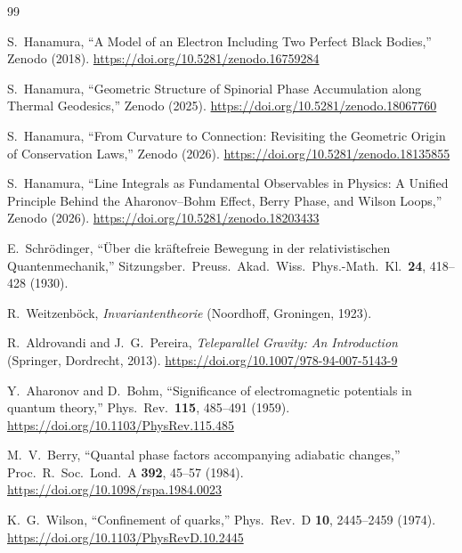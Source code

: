 \documentclass[12pt,letterpaper]{article}
\begin{document}
\begin{thebibliography}{99}

S.~Hanamura,
``A Model of an Electron Including Two Perfect Black Bodies,''
Zenodo (2018).
\href{https://doi.org/10.5281/zenodo.16759284}{https://doi.org/10.5281/zenodo.16759284}

S.~Hanamura,
``Geometric Structure of Spinorial Phase Accumulation along Thermal Geodesics,''
Zenodo (2025).
\href{https://doi.org/10.5281/zenodo.18067760}{https://doi.org/10.5281/zenodo.18067760}

S.~Hanamura,
``From Curvature to Connection: Revisiting the Geometric Origin of Conservation Laws,''
Zenodo (2026).
\href{https://doi.org/10.5281/zenodo.18135855}{https://doi.org/10.5281/zenodo.18135855}

S.~Hanamura,
``Line Integrals as Fundamental Observables in Physics: A Unified Principle Behind the Aharonov--Bohm Effect, Berry Phase, and Wilson Loops,''
Zenodo (2026).
\href{https://doi.org/10.5281/zenodo.18203433}{https://doi.org/10.5281/zenodo.18203433}

E.~Schr\"{o}dinger,
``\"{U}ber die kr\"{a}ftefreie Bewegung in der relativistischen Quantenmechanik,''
Sitzungsber.\ Preuss.\ Akad.\ Wiss.\ Phys.-Math.\ Kl.\ \textbf{24}, 418--428 (1930).

R.~Weitzenb\"{o}ck,
\textit{Invariantentheorie}
(Noordhoff, Groningen, 1923).

R.~Aldrovandi and J.~G.~Pereira,
\textit{Teleparallel Gravity: An Introduction}
(Springer, Dordrecht, 2013).
\href{https://doi.org/10.1007/978-94-007-5143-9}{https://doi.org/10.1007/978-94-007-5143-9}

Y.~Aharonov and D.~Bohm,
``Significance of electromagnetic potentials in quantum theory,''
Phys.\ Rev.\ \textbf{115}, 485--491 (1959).
\href{https://doi.org/10.1103/PhysRev.115.485}{https://doi.org/10.1103/PhysRev.115.485}

M.~V.~Berry,
``Quantal phase factors accompanying adiabatic changes,''
Proc.\ R.\ Soc.\ Lond.\ A \textbf{392}, 45--57 (1984).
\href{https://doi.org/10.1098/rspa.1984.0023}{https://doi.org/10.1098/rspa.1984.0023}

K.~G.~Wilson,
``Confinement of quarks,''
Phys.\ Rev.\ D \textbf{10}, 2445--2459 (1974).
\href{https://doi.org/10.1103/PhysRevD.10.2445}{https://doi.org/10.1103/PhysRevD.10.2445}


\end{thebibliography}
\end{document}

